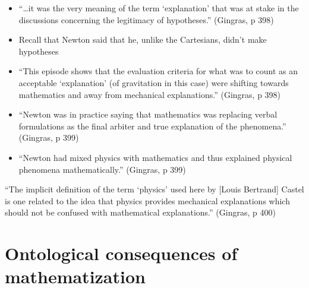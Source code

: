 \documentclass[fleqn]{beamer}
\begin{document}
\begin{frame}

  \begin{itemize}
  \item ``\dots it was the very meaning of the term `explanation' that
    was at stake in the discussions concerning the legitimacy of
    hypotheses.'' (Gingras, p 398)
  \item Recall that Newton said that he, unlike the Cartesians, didn't
    make hypotheses
  \item ``This episode shows that the evaluation criteria for what was
    to count as an acceptable `explanation' (of gravitation in this
    case) were shifting towards mathematics and away from mechanical
    explanations.'' (Gingras, p 398)
  \end{itemize}

\end{frame}

\begin{frame}

  \begin{itemize}
  \item ``Newton was in practice saying that mathematics was replacing
    verbal formulations as the final arbiter and true explanation of
    the phenomena.'' (Gingras, p 399)
  \item ``Newton had mixed physics with mathematics and thus explained
    physical phenomena mathematically.'' (Gingras, p 399)
  \end{itemize}

\end{frame}

\begin{frame}

  ``The implicit definition of the term `physics' used here by [Louis
  Bertrand] Castel is one related to the idea that physics provides
  mechanical explanations which should not be confused with
  mathematical explanations.'' (Gingras, p 400)

\end{frame}

\section{Ontological consequences of mathematization}
\end{document}
